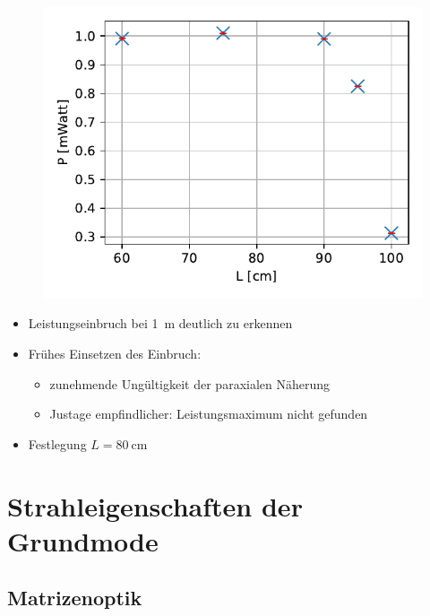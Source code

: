 \documentclass[10pt, aspectratio=169]{beamer}
\begin{document}
\begin{frame}
  \begin{figure}[H]\centering
    \includegraphics[width=.5\columnwidth]{figs/power-over-l.pdf}
  \end{figure}
  \begin{itemize}
  \item<1-> Leistungseinbruch bei \SI{1}{\meter} deutlich zu erkennen
  \item<2-> Fr\"uhes Einsetzen des Einbruch:
    \begin{itemize}
    \item zunehmende Ung\"ultigkeit der paraxialen N\"aherung
    \item Justage empfindlicher: Leistungsmaximum nicht gefunden
    \end{itemize}
  \item<3-> Festlegung \(L=\SI{80}{\centi\meter}\)
  \end{itemize}
\end{frame}

\section{Strahleigenschaften der Grundmode}
\label{sec:seig}

\subsection{Matrizenoptik}
\label{sec:mao}
\end{document}
